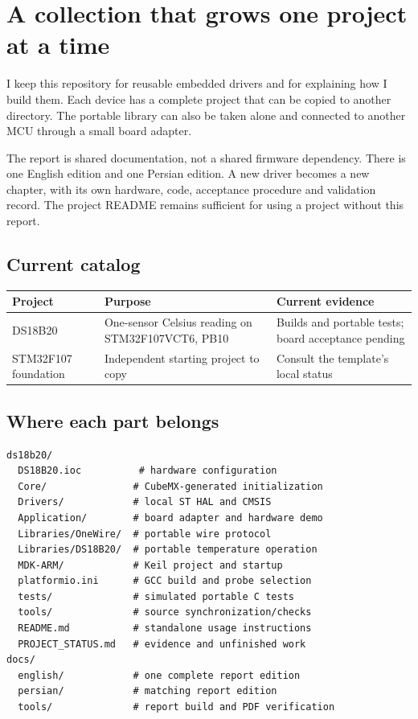 \section{A collection that grows one project at a time}
I keep this repository for reusable embedded drivers and for explaining how I build them. Each device has a complete project that can be copied to another directory. The portable library can also be taken alone and connected to another MCU through a small board adapter.

The report is shared documentation, not a shared firmware dependency. There is one English edition and one Persian edition. A new driver becomes a new chapter, with its own hardware, code, acceptance procedure and validation record. The project README remains sufficient for using a project without this report.

\subsection{Current catalog}
\begin{tabular}{p{27mm}p{57mm}p{49mm}}
\toprule
Project & Purpose & Current evidence\\
\midrule
DS18B20 & One-sensor Celsius reading on STM32F107VCT6, PB10 & Builds and portable tests; board acceptance pending\\
STM32F107 foundation & Independent starting project to copy & Consult the template's local status\\
\bottomrule
\end{tabular}

\subsection{Where each part belongs}
\begin{lstlisting}[language={},numbers=none]
ds18b20/
  DS18B20.ioc          # hardware configuration
  Core/               # CubeMX-generated initialization
  Drivers/            # local ST HAL and CMSIS
  Application/        # board adapter and hardware demo
  Libraries/OneWire/  # portable wire protocol
  Libraries/DS18B20/  # portable temperature operation
  MDK-ARM/            # Keil project and startup
  platformio.ini      # GCC build and probe selection
  tests/              # simulated portable C tests
  tools/              # source synchronization/checks
  README.md           # standalone usage instructions
  PROJECT_STATUS.md   # evidence and unfinished work
docs/
  english/            # one complete report edition
  persian/            # matching report edition
  tools/              # report build and PDF verification
\end{lstlisting}

